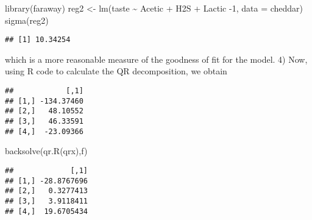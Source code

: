 \documentclass[
]{article}
\newenvironment{Shaded}{\begin{snugshade}}{\end{snugshade}}
\newcommand{\AttributeTok}[1]{\textcolor[rgb]{0.77,0.63,0.00}{#1}}
\newcommand{\DecValTok}[1]{\textcolor[rgb]{0.00,0.00,0.81}{#1}}
\newcommand{\FunctionTok}[1]{\textcolor[rgb]{0.00,0.00,0.00}{#1}}
\newcommand{\NormalTok}[1]{#1}
\newcommand{\OtherTok}[1]{\textcolor[rgb]{0.56,0.35,0.01}{#1}}
\newcommand{\SpecialCharTok}[1]{\textcolor[rgb]{0.00,0.00,0.00}{#1}}
\begin{document}
\begin{Shaded}
\begin{Highlighting}[]
    \FunctionTok{library}\NormalTok{(faraway)}
\NormalTok{    reg2 }\OtherTok{\textless{}{-}} \FunctionTok{lm}\NormalTok{(taste }\SpecialCharTok{\textasciitilde{}}\NormalTok{ Acetic }\SpecialCharTok{+}\NormalTok{ H2S }\SpecialCharTok{+}\NormalTok{ Lactic }\SpecialCharTok{{-}}\DecValTok{1}\NormalTok{, }\AttributeTok{data =}\NormalTok{ cheddar)}
    \FunctionTok{sigma}\NormalTok{(reg2)}
\end{Highlighting}
\end{Shaded}

\begin{verbatim}
## [1] 10.34254
\end{verbatim}

which is a more reasonable measure of the goodness of fit for the model.
4) Now, using R code to calculate the QR decomposition, we obtain

\begin{Shaded}
\end{Shaded}

\begin{verbatim}
##            [,1]
## [1,] -134.37460
## [2,]   48.10552
## [3,]   46.33591
## [4,]  -23.09366
\end{verbatim}

\begin{Shaded}
\begin{Highlighting}[]
   \FunctionTok{backsolve}\NormalTok{(}\FunctionTok{qr.R}\NormalTok{(qrx),f)}
\end{Highlighting}
\end{Shaded}

\begin{verbatim}
##             [,1]
## [1,] -28.8767696
## [2,]   0.3277413
## [3,]   3.9118411
## [4,]  19.6705434
\end{verbatim}
\end{document}
